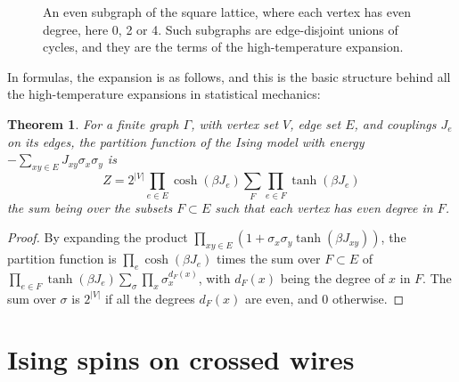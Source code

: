 \documentclass[11pt,a4paper]{article}
\newtheorem{thm}{Theorem}[section]
\theoremstyle{remark}
\begin{document}
\begin{figure}[htb!]
\centering
{}
\caption{An even subgraph of the square lattice, where each vertex has even degree, here 0, 2 or 4. Such subgraphs are edge-disjoint unions of cycles, and they are the terms of the high-temperature expansion.}\label{fig:loops}
\end{figure}

In formulas, the expansion is as follows, and this is the basic structure behind all the high-temperature expansions in statistical mechanics:

\begin{samepage}
\begin{thm}\label{thm:vdw}
For a finite graph $\Gamma$, with vertex set $V$, edge set $E$, and couplings $J_e$ on its edges, the partition function of the Ising model with energy $-\sum_{xy\in E}J_{xy}\sigma_x\sigma_y$ is
\[
 Z=2^{|V|}\prod_{e\in E}\cosh(\beta J_e)\sum_F\prod_{e\in F}\tanh(\beta J_e)
\]
the sum being over the subsets $F\subset E$ such that each vertex has even degree in $F$.
\end{thm}
\end{samepage}

\begin{proof}
By expanding the product $\prod_{xy\in E}(1+\sigma_x\sigma_y\tanh(\beta J_{xy}))$, the partition function is $\prod_e\cosh(\beta J_e)$ times the sum over $F\subset E$ of $\prod_{e\in F}\tanh(\beta J_e)\sum_\sigma\prod_x\sigma_x^{d_F(x)}$, with $d_F(x)$ being the degree of $x$ in $F$. The sum over $\sigma$ is $2^{|V|}$ if all the degrees $d_F(x)$ are even, and $0$ otherwise.
\end{proof}

\section{Ising spins on crossed wires}\label{sec:model}
\end{document}
